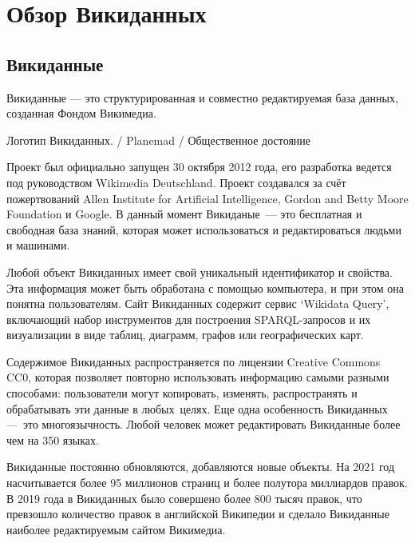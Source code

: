 \chapter{Обзор Викиданных}
\label{ch:ReviewAboutWD}

\section{Викиданные}
Викиданные — это структурированная и совместно редактируемая база данных, созданная Фондом Викимедиа\footnotemark {}. \begin{marginfigure}[0.0cm]
{
	\setlength{\fboxsep}{0pt}%
	\setlength{\fboxrule}{1pt}%
}
\caption
{Логотип Викиданных.  / Planemad / Общественное достояние
}
\label{fig:seyu}
\end{marginfigure}Проект был официально запущен 30 октября 2012 года, его разработка ведется под руководством Wikimedia Deutschland\cite{Wikipedia_review}. Проект создавался за счёт пожертвований Allen Institute for Artificial Intelligence, Gordon and Betty Moore Foundation и Google. В данный момент Викиданые — это бесплатная и свободная база знаний, которая может использоваться и редактироваться людьми и машинами\cite{Vrandecic}.

Любой объект Викиданных имеет свой уникальный идентификатор и свойства. Эта информация может быть обработана с помощью компьютера, и при этом она понятна пользователям. Сайт Викиданных содержит сервис ‘Wikidata Query’, включающий набор инструментов для построения SPARQL-запросов и их визуализации в виде таблиц, диаграмм, графов или географических карт.

Содержимое Викиданных распространяется по лицензии Creative Commons CC0, которая позволяет повторно использовать информацию самыми разными способами: пользователи могут копировать, изменять, распространять и обрабатывать эти данные в любых целях. Еще одна особенность Викиданных --- это многоязычность. Любой человек может редактировать Викиданные более чем на 350 языках.

Викиданные постоянно обновляются, добавляются новые объекты. На 2021 год насчитывается более 95 миллионов страниц и более полутора миллиардов правок\footnotemark.  В 2019 года в Викиданных было совершено более 800 тысяч правок, что превзошло количество правок в английской Википедии и сделало Викиданные наиболее редактируемым сайтом Викимедиа\footnotemark . 
